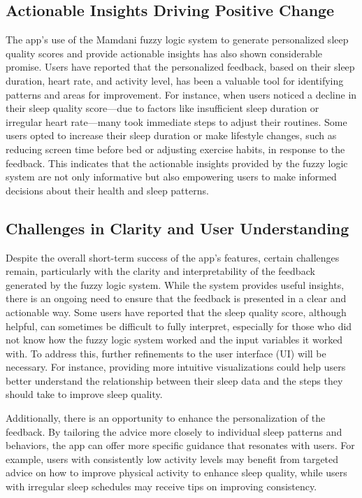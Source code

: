 \documentclass[10pt,twocolumn]{article}
\begin{document}
\subsection{Actionable Insights Driving Positive Change} The app's use of the Mamdani fuzzy logic system to generate personalized sleep quality scores and provide actionable insights has also shown considerable promise. Users have reported that the personalized feedback, based on their sleep duration, heart rate, and activity level, has been a valuable tool for identifying patterns and areas for improvement. For instance, when users noticed a decline in their sleep quality score—due to factors like insufficient sleep duration or irregular heart rate—many took immediate steps to adjust their routines. Some users opted to increase their sleep duration or make lifestyle changes, such as reducing screen time before bed or adjusting exercise habits, in response to the feedback. This indicates that the actionable insights provided by the fuzzy logic system are not only informative but also empowering users to make informed decisions about their health and sleep patterns.

\subsection{Challenges in Clarity and User Understanding} Despite the overall short-term success of the app's features, certain challenges remain, particularly with the clarity and interpretability of the feedback generated by the fuzzy logic system. While the system provides useful insights, there is an ongoing need to ensure that the feedback is presented in a clear and actionable way. Some users have reported that the sleep quality score, although helpful, can sometimes be difficult to fully interpret, especially for those who did not know how the fuzzy logic system worked and the input variables it worked with. To address this, further refinements to the user interface (UI) will be necessary. For instance, providing more intuitive visualizations could help users better understand the relationship between their sleep data and the steps they should take to improve sleep quality.

Additionally, there is an opportunity to enhance the personalization of the feedback. By tailoring the advice more closely to individual sleep patterns and behaviors, the app can offer more specific guidance that resonates with users. For example, users with consistently low activity levels may benefit from targeted advice on how to improve physical activity to enhance sleep quality, while users with irregular sleep schedules may receive tips on improving consistency.
\end{document}
